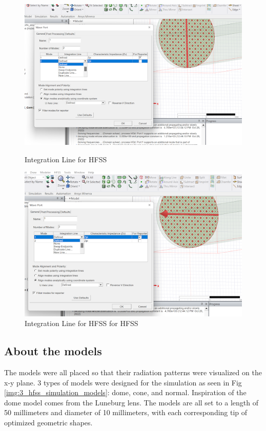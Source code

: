 \documentclass[a4paper,12pt]{report}
\begin{document}
\begin{figure}
  \centering
  \begin{minipage}{0.45\textwidth}
    \centering
    \includegraphics[clip, keepaspectratio, width=0.9\linewidth]{img/hfss_mode_integration_line_1.png}
    \caption{Integration Line for HFSS}
    \label{fig:hfss_mode_integration_line_1}
  \end{minipage}\hfill
  \begin{minipage}{0.45\textwidth}
    \centering
    \includegraphics[clip, keepaspectratio, width=0.9\linewidth]{img/hfss_mode_integration_line_2.png}
    \caption{Integration Line for HFSS for HFSS}
    \label{fig:hfss_mode_integration_line_2}
  \end{minipage}\hfill
\end{figure}

\subsection{About the models}

The models were all placed so that their radiation patterns
were visualized on the x-y plane.
3 types of models were designed for the simulation as seen in
Fig \ref{img:3_hfss_simulation_models}:
dome, cone, and normal.
Inspiration of the dome model comes from the Luneburg lens.
The models are all set to a length of 50 millimeters and diameter of
10 millimeters,
with each corresponding tip of optimized geometric shapes.
\end{document}
